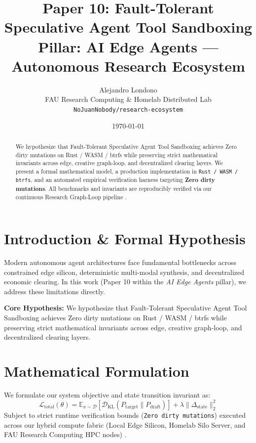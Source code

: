 \documentclass[10pt,twocolumn]{article}
\title{\textbf{Paper 10: Fault-Tolerant Speculative Agent Tool Sandboxing}\\
\large Pillar: AI Edge Agents --- Autonomous Research Ecosystem}
\author{
  Alejandro Londono \\
  FAU Research Computing \& Homelab Distributed Lab \\
  \texttt{NoJuanNobody/research-ecosystem}
}
\date{\today}
\begin{document}
\maketitle

\begin{abstract}
We hypothesize that Fault-Tolerant Speculative Agent Tool Sandboxing achieves Zero dirty mutations on Rust / WASM / btrfs while preserving strict mathematical invariants across edge, creative graph-loop, and decentralized clearing layers.
We present a formal mathematical model, a production implementation in \texttt{Rust / WASM / btrfs}, and an automated empirical verification harness targeting \textbf{Zero dirty mutations}. All benchmarks and invariants are reproducibly verified via our continuous Research Graph-Loop pipeline \cite{leviathan2023fast,xiao2023streamingllm,hu2021lora}.
\end{abstract}

\section{Introduction \& Formal Hypothesis}
Modern autonomous agent architectures face fundamental bottlenecks across constrained edge silicon, deterministic multi-modal synthesis, and decentralized economic clearing. In this work (Paper 10 within the \textit{AI Edge Agents} pillar), we address these limitations directly.

\textbf{Core Hypothesis:} We hypothesize that Fault-Tolerant Speculative Agent Tool Sandboxing achieves Zero dirty mutations on Rust / WASM / btrfs while preserving strict mathematical invariants across edge, creative graph-loop, and decentralized clearing layers.

\section{Mathematical Formulation}
We formulate our system objective and state transition invariant as:
\begin{equation}
\mathcal{L}_{\text{total}}(\theta) = \mathbb{E}_{x \sim \mathcal{D}}\left[\mathcal{D}_{\text{KL}}(P_{\text{target}} \parallel P_{\text{draft}})\right] + \lambda \|\Delta_{\text{state}}\|_2^2
\end{equation}
Subject to strict runtime verification bounds (\texttt{Zero dirty mutations}) executed across our hybrid compute fabric (Local Edge Silicon, Homelab Silo Server, and FAU Research Computing HPC nodes) \cite{rafailov2023dpo,shapley1953value,hanson2003combinatorial}.
\end{document}
